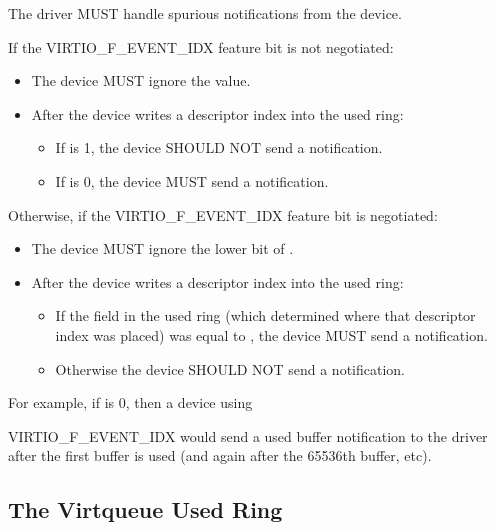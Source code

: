 The driver MUST handle spurious notifications from the device.


If the VIRTIO_F_EVENT_IDX feature bit is not negotiated:
\begin{itemize}
\item The device MUST ignore the  value.
\item After the device writes a descriptor index into the used ring:
  \begin{itemize}
  \item If  is 1, the device SHOULD NOT send a notification.
  \item If  is 0, the device MUST send a notification.
  \end{itemize}
\end{itemize}

Otherwise, if the VIRTIO_F_EVENT_IDX feature bit is negotiated:
\begin{itemize}
\item The device MUST ignore the lower bit of .
\item After the device writes a descriptor index into the used ring:
  \begin{itemize}
  \item If the  field in the used ring (which determined
    where that descriptor index was placed) was equal to
    , the device MUST send a notification.
  \item Otherwise the device SHOULD NOT send a notification.
  \end{itemize}
\end{itemize}

\begin{note}
For example, if  is 0, then a device using

  VIRTIO_F_EVENT_IDX would send a used buffer notification
  to the driver after the first buffer is
  used (and again after the 65536th buffer, etc).
\end{note}

\subsection{The Virtqueue Used Ring}\label{sec:Basic Facilities of a Virtio Device / Virtqueues / The Virtqueue Used Ring}

